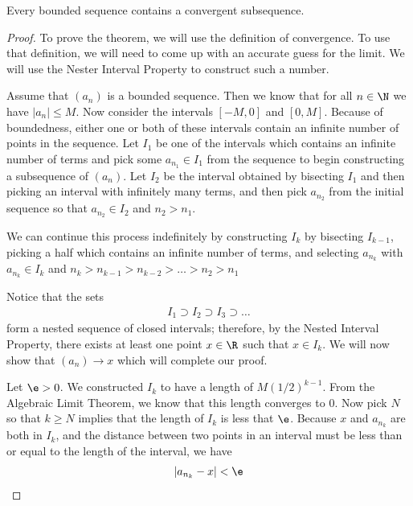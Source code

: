 \begin{theorem}
	Every bounded sequence contains a convergent subsequence. 	
\end{theorem}

\begin{proof}
	To prove the theorem, we will use the definition of convergence. To use that definition, we will need to come up with an accurate guess for the limit. We will use the Nester Interval Property to construct such a number.

	Assume that $\left( a_n \right) $ is a bounded sequence. Then we know that for all $n \in \N$ we have $\left|a_n\right| \le  M$. Now consider the intervals  $[-M, 0]$ and  $[0, M]$. Because of boundedness, either one or both of these intervals contain an infinite number of points in the sequence. Let $I_1$ be one of the intervals which contains an infinite number of terms and pick some $a_{n_1} \in I_1$ from the sequence to begin constructing a subsequence of $\left( a_n \right) $. Let $I_2$ be the interval obtained by bisecting $I_1$ and then picking an interval with infinitely many terms, and then pick $a_{n_2}$ from the initial sequence so that $a_{n_2} \in I_2$ and $n_2 > n_1$. 

We can continue this process indefinitely by constructing $I_k$ by bisecting $I_{k-1}$, picking a half which contains an infinite number of terms, and selecting $a_{n_k}$ with $a_{n_k} \in I_k$ and $n_k > n_{k-1} > n_{k - 2} > \ldots > n_2 > n_1$ 

Notice that the sets
\begin{align}
	I_1 \supset I_2 \supset I_3 \supset \ldots
\end{align}
form a nested sequence of closed intervals; therefore, by the Nested Interval Property, there exists at least one point $x \in \R$ such that $x \in I_k$. We will now show that $\left( a_n \right) \to x$ which will complete our proof.

Let $\e > 0$. We constructed $I_k$ to have a length of $M\left( 1 / 2 \right)^{k-1}$. From the Algebraic Limit Theorem, we know that this length converges to $0$. Now pick $N$ so that $k \ge N$ implies that the length of $I_k$ is less that $\e$. Because $x$ and $a_{n_k}$ are both in $I_{k}$, and the distance between two points in an interval must be less than or equal to the length of the interval, we have 
\begin{align}
	\left|a_{n_k} - x\right| < \e
\end{align}
\end{proof}


